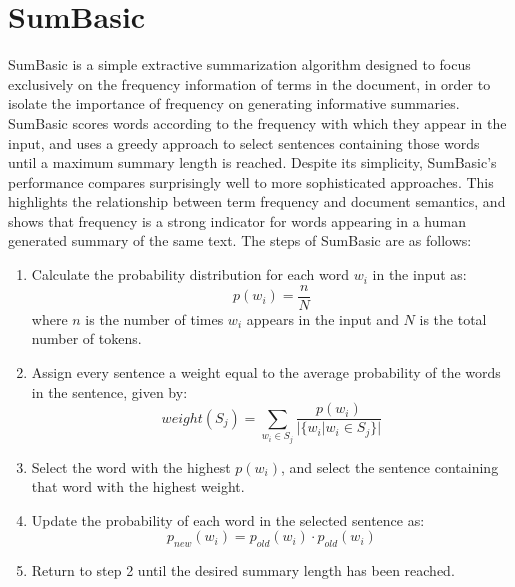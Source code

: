 \documentclass[../writeup.tex]{subfiles}
\begin{document}
\section{SumBasic}\label{sam:sec:sum_basic}
SumBasic\autocite*[]{sumbasic} is a simple extractive summarization algorithm designed to focus exclusively on the frequency information of terms in the document, in order to isolate the importance of frequency on generating informative summaries.
SumBasic scores words according to the frequency with which they appear in the input, and uses a greedy approach to select sentences containing those words until a maximum summary length is reached.
Despite its simplicity, SumBasic's performance compares surprisingly well to more sophisticated approaches.
This highlights the relationship between term frequency and document semantics, and shows that frequency is a strong indicator for words appearing in a human generated summary of the same text.
The steps of SumBasic are as follows:
\begin{enumerate}
    \item Calculate the probability distribution for each word $w_i$ in the input as:
          \begin{equation}\label{sam:eq:word_prob}
              p(w_i) = \frac{n}{N}
          \end{equation}
          where $n$ is the number of times $w_i$ appears in the input and $N$ is the total number of tokens.
    \item Assign every sentence a weight equal to the average probability of the words in the sentence, given by:
          \begin{equation}\label{sam:eq:sum_basic_sentence_weight}
              weight(S_j) = \sum_{w_i \in S_j} \frac{p(w_i)}{|\{w_i | w_i \in S_j\}|}
          \end{equation}
    \item Select the word with the highest $p(w_i)$, and select the sentence containing that word with the highest weight.
    \item Update the probability of each word in the selected sentence as:
          \begin{equation}\label{sam:eq:sum_basic_weight_update}
              p_{new}(w_i) = p_{old}(w_i) \cdot p_{old}(w_i)
          \end{equation}
    \item Return to step 2 until the desired summary length has been reached.
\end{enumerate}
\end{document}
